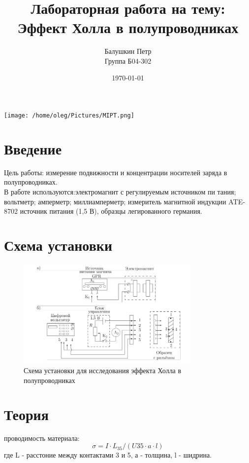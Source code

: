 \documentclass[a4paper, 12pt]{article}
\begin{document}
\begin{titlepage}
    \title{Лабораторная работа на тему: \\    
    Эффект Холла в полупроводниках}
    \author{Балушкин Петр \\
    Группа Б04-302}
    \date{\today}
    \maketitle
    \vfill
    \begin{center}
        \texttt{[image: /home/oleg/Pictures/MIPT.png]}
    \end{center}
\end{titlepage}

\setcounter{page}{2}
\tableofcontents
\newpage
\section{Введение}
Цель работы: измерение подвижности и концентрации носителей заряда
в полупроводниках.
\\

В работе используются:электромагнит с регулируемым источником пи­
тания; вольтметр; амперметр; миллиамперметр; измеритель магнитной 
индукции ATE-8702 источник питания (1,5 В), образцы легированного германия.
\section{Схема установки}
\begin{figure}[h!]
    \centering
    \includegraphics[width=90mm]{./images/ustanovka.png}
    \caption{Схема установки для исследования эффекта Холла в полупроводниках}
\end{figure}


\section{Теория}
проводимость материала:
\[\sigma = I \cdot L_{35}/(U{35}\cdot a\cdot l)\]
где L - расстоние между контактами 3 и 5, а - толщина, l - шидрина.
\end{document}
